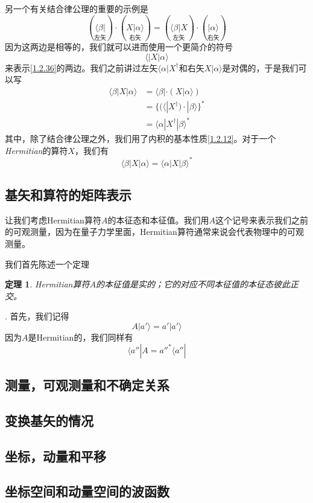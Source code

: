 \documentclass[UTF8,twoside]{ctexart}
\newtheorem{theo}{定理}[section]
\def\be{\begin{equation}}
\def\ee{\end{equation}}
\begin{document}
另一个有关结合律公理的重要的示例是
\be\label{1.2.36}
(\underset{\text{左矢}}{\langle\beta|})\cdot(\underset{\text{右矢}}{X|\alpha\rangle}) = (\underset{\text{左矢}}{\langle\beta|X})\cdot(\underset{\text{右矢}}{|\alpha\rangle})
\ee
因为这两边是相等的，我们就可以进而使用一个更简介的符号
\be
\langle|X|\alpha\rangle
\ee
来表示\eqref{1.2.36}的两边。我们之前讲过左矢$\langle\alpha|X^\dagger$和右矢$X|\alpha\rangle$是对偶的，于是我们可以写
\be
\begin{split}
\langle\beta|X|\alpha\rangle& = \langle\beta|\cdot(X|\alpha\rangle)\\
&=\{(\langle|X^\dagger)\cdot|\beta\rangle\}^*\\
&=\langle\alpha|X^\dagger|\beta\rangle^*
\end{split}
\ee
其中，除了结合律公理之外，我们用了内积的基本性质\eqref{1.2.12}。对于一个{\it Hermitian}的算符$X$，我们有
\be
\langle\beta|X|\alpha\rangle = \langle\alpha|X|\beta\rangle^*
\ee



\subsection{基矢和算符的矩阵表示}


\noindent 让我们考虑Hermitian算符$A$的本征态和本征值。我们用$A$这个记号来表示我们之前的可观测量，因为在量子力学里面，Hermitian算符通常来说会代表物理中的可观测量。

我们首先陈述一个定理

\begin{theo}
Hermitian算符$A$的本征值是实的；它的对应不同本征值的本征态彼此正交。
\end{theo}

. 首先，我们记得
\be
A|a'\rangle = a'|a'\rangle
\ee
因为$A$是Hermitian的，我们同样有
\be
\langle a''|A = a''^*\langle a''|
\ee


\subsection{测量，可观测量和不确定关系}
\subsection{变换基矢的情况}
\subsection{坐标，动量和平移} \label{s1.6}
\subsection{坐标空间和动量空间的波函数}
\end{document}
